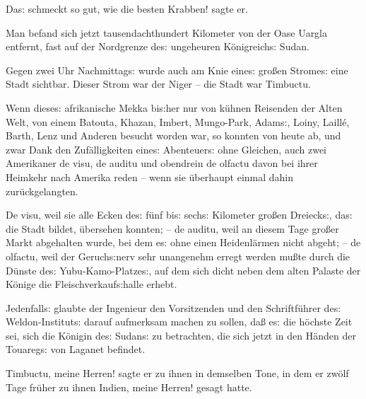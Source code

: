 \documentclass[oneside,12pt]{book}
\newenvironment{antiqua}{\normalfont}{}
\newcommand{\s}{s:}
\begin{document}
{\glqq}Da{\s} schmeckt so gut, wie die besten Krabben!{\grqq} sagte er.

Man befand sich jetzt tausendachthundert Kilometer von der Oase
Uargla entfernt, fast auf der Nordgrenze de{\s} ungeheuren
K\"onigreich{\s} Sudan.

Gegen zwei Uhr Nachmittag{\s} wurde auch am Knie eine{\s} gro{\ss}en
Strome{\s} eine Stadt sichtbar. Dieser Strom war der Niger -- die
Stadt war Timbuctu.

Wenn diese{\s} afrikanische Mekka bi{\s}her nur von k\"uhnen
Reisenden der Alten Welt, von einem Batouta, Khazan, Imbert,
Mungo-Park, Adam{\s}, Loiny, Laill\'e, Barth, Lenz und Anderen
besucht worden war, so konnten von heute ab, und zwar Dank den
Zuf\"alligkeiten eine{\s} Abenteuer{\s} ohne Gleichen, auch zwei
Amerikaner \begin{antiqua}de visu, de auditu\end{antiqua} und
obendrein \begin{antiqua}de olfactu\end{antiqua} davon bei ihrer
Heimkehr nach Amerika reden -- wenn sie \"uberhaupt einmal dahin
zur\"uckgelangten.

\begin{antiqua}De visu\end{antiqua}, weil sie alle Ecken de{\s}
f\"unf bi{\s} sech{\s} Kilometer gro{\ss}en Dreieck{\s}, da{\s} die
Stadt bildet, \"ubersehen konnten; -- \begin{antiqua}de
auditu\end{antiqua}, weil an diesem Tage gro{\ss}er Markt abgehalten
wurde, bei dem e{\s} ohne einen Heidenl\"armen nicht abgeht; --
\begin{antiqua}de olfactu\end{antiqua}, weil der Geruch{\s}nerv sehr
unangenehm erregt werden mu{\ss}te durch die D\"unste de{\s}
Yubu-Kamo-Platze{\s}, auf dem sich dicht neben dem alten Palaste der
K\"onige die Fleischverkauf{\s}halle erhebt.

Jedenfall{\s} glaubte der Ingenieur den Vorsitzenden und den
Schriftf\"uhrer de{\s} Weldon-Institut{\s} darauf aufmerksam machen
zu sollen, da{\ss} e{\s} die h\"ochste Zeit sei, sich die K\"onigin
de{\s} Sudan{\s} zu betrachten, die sich jetzt in den H\"anden der
Touareg{\s} von Laganet befindet.

{\glqq}Timbuctu, meine Herren!{\grqq} sagte er zu ihnen in demselben
Tone, in dem er zw\"olf Tage fr\"uher zu ihnen {\glqq}Indien, meine
Herren!{\grqq} gesagt hatte.
\end{document}

